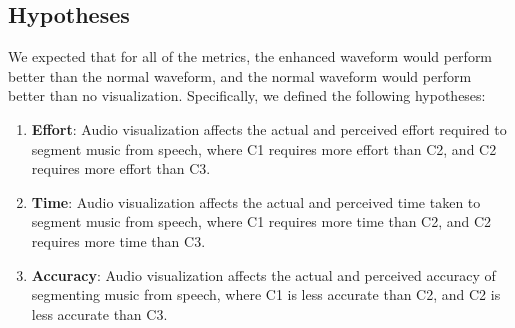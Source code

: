 
\subsection{Hypotheses}

We expected that for all of the metrics, the enhanced waveform would perform better than the normal waveform, and
the normal waveform would perform better than no visualization. Specifically, we defined the following hypotheses:

\newcommand{\subscript}[2]{$#1 _ #2$}
\begin{enumerate}[label=H\arabic*.]
  \item \textbf{Effort}: Audio visualization affects the actual and perceived effort required to segment music from
    speech, where C1 requires more effort than C2, and C2 requires more effort than C3.
  \item \textbf{Time}: Audio visualization affects the actual and perceived time taken to segment music from speech,
    where C1 requires more time than C2, and C2 requires more time than C3.
  \item \textbf{Accuracy}: Audio visualization affects the actual and perceived accuracy of segmenting music from
    speech, where C1 is less accurate than C2, and C2 is less accurate than C3.
\end{enumerate}


